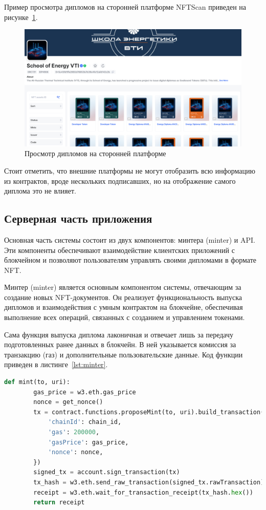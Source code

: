 Пример просмотра дипломов на сторонней платформе NFTScan приведен на рисунке~\ref{fig:nftscan}.

\begin{figure}[H]
	\centering
	\includegraphics[width=1\textwidth]{images/3.nftscan.png}
	\parskip=6pt
	\caption{Просмотр дипломов на сторонней платформе}
	\label{fig:nftscan}
\end{figure}

Стоит отметить, что внешние платформы не могут отобразить всю информацию из контрактов, вроде нескольких подписавших, но на отображение самого диплома это не влияет.

\subsection{Серверная часть приложения}

Основная часть системы состоит из двух компонентов: минтера (minter) и API. Эти компоненты обеспечивают взаимодействие клиентских приложений с блокчейном и позволяют пользователям управлять своими дипломами в формате NFT.

Минтер (minter) является основным компонентом системы, отвечающим за создание новых NFT-документов. Он реализует функциональность выпуска дипломов и взаимодействия с умным контрактом на блокчейне, обеспечивая выполнение всех операций, связанных с созданием и управлением токенами.

Сама функция выпуска диплома лаконичная и отвечает лишь за передачу подготовленных ранее данных в блокчейн. В ней указывается комиссия за транзакцию (газ) и дополнительные пользовательские данные. Код функции приведен в листинге~\ref{lst:minter}.

\begin{lstlisting}[label=lst:minter, language=Python, caption=Функция выпуска диплома]
    def mint(to, uri):
        gas_price = w3.eth.gas_price
        nonce = get_nonce()
        tx = contract.functions.proposeMint(to, uri).build_transaction({
            'chainId': chain_id,
            'gas': 200000,
            'gasPrice': gas_price,
            'nonce': nonce,
        })
        signed_tx = account.sign_transaction(tx)
        tx_hash = w3.eth.send_raw_transaction(signed_tx.rawTransaction)
        receipt = w3.eth.wait_for_transaction_receipt(tx_hash.hex())
        return receipt
\end{lstlisting}

